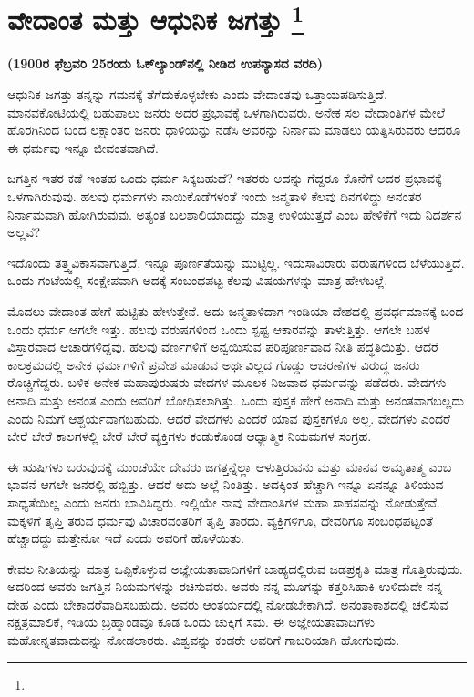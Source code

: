 
\chapter[ವೇದಾಂತ ಮತ್ತು ಆಧುನಿಕ ಜಗತ್ತು ]{ವೇದಾಂತ ಮತ್ತು ಆಧುನಿಕ ಜಗತ್ತು \protect\footnote{}}

\centerline{\textbf{(1900ರ ಫೆಬ್ರವರಿ 25ರಂದು ಓಕ್​ಲ್ಯಾಂಡ್​ನಲ್ಲಿ ನೀಡಿದ ಉಪನ್ಯಾಸದ ವರದಿ)}}

ಆಧುನಿಕ ಜಗತ್ತು ತನ್ನನ್ನು ಗಮನಕ್ಕೆ ತೆಗೆದುಕೊಳ್ಳಬೇಕು ಎಂದು ವೇದಾಂತವು ಒತ್ತಾಯಪಡಿಸುತ್ತಿದೆ. ಮಾನವಕೋಟಿಯಲ್ಲಿ ಬಹುಪಾಲು ಜನರು ಅದರ ಪ್ರಭಾವಕ್ಕೆ ಒಳಗಾಗಿರುವರು. ಅನೇಕ ಸಲ ವೇದಾಂತಿಗಳ ಮೇಲೆ ಹೊರಗಿನಿಂದ ಬಂದ ಲಕ್ಷಾಂತರ ಜನರು ಧಾಳಿಯನ್ನು ನಡೆಸಿ ಅವರನ್ನು ನಿರ್ನಾಮ ಮಾಡಲು ಯತ್ನಿಸಿರುವರು ಆದರೂ ಈ ಧರ್ಮವು ಇನ್ನೂ ಜೀವಂತವಾಗಿದೆ.

ಜಗತ್ತಿನ ಇತರ ಕಡೆ ಇಂತಹ ಒಂದು ಧರ್ಮ ಸಿಕ್ಕಬಹುದೆ? ಇತರರು ಅದನ್ನು ಗೆದ್ದರೂ ಕೊನೆಗೆ ಅದರ ಪ್ರಭಾವಕ್ಕೆ ಒಳಗಾಗಿರುವುವು. ಹಲವು ಧರ್ಮಗಳು ನಾಯಿಕೊಡೆಗಳಂತೆ ಇಂದು ಜನ್ಮತಾಳಿ ಕೆಲವು ದಿನಗಳಿದ್ದು ಅನಂತರ ನಿರ್ನಾಮವಾಗಿ ಹೋಗಿರುವುವು. ಅತ್ಯಂತ ಬಲಶಾಲಿಯಾದದ್ದು ಮಾತ್ರ ಉಳಿಯುತ್ತದೆ ಎಂಬ ಹೇಳಿಕೆಗೆ ಇದು ನಿದರ್ಶನ ಅಲ್ಲವೆ?

ಇದೊಂದು ತತ್ತ್ವವಿಕಾಸವಾಗುತ್ತಿದೆ, ಇನ್ನೂ ಪೂರ್ಣತೆಯನ್ನು ಮುಟ್ಟಿಲ್ಲ. ಇದು\break ಸಾವಿರಾರು ವರುಷಗಳಿಂದ ಬೆಳೆಯುತ್ತಿದೆ. ಒಂದು ಗಂಟೆಯಲ್ಲಿ ಸಂಕ್ಷೇಪವಾಗಿ ಅದಕ್ಕೆ ಸಂಬಂಧಪಟ್ಟ ಕೆಲವು ವಿಷಯಗಳನ್ನು ಮಾತ್ರ ಹೇಳಬಲ್ಲೆ.

ಮೊದಲು ವೇದಾಂತ ಹೇಗೆ ಹುಟ್ಟಿತು ಹೇಳುತ್ತೇನೆ. ಅದು ಜನ್ಮತಾಳಿದಾಗ ಇಂಡಿಯಾ ದೇಶದಲ್ಲಿ ಪ್ರವರ್ಧಮಾನಕ್ಕೆ ಬಂದ ಒಂದು ಧರ್ಮ ಆಗಲೇ ಇತ್ತು. ಹಲವು ವರುಷಗಳಿಂದ ಒಂದು ಸ್ಪಷ್ಟ ಆಕಾರವನ್ನು ತಾಳುತ್ತಿತ್ತು. ಆಗಲೇ ಬಹಳ ವಿಸ್ತಾರವಾದ ಆಚಾರಗಳಿದ್ದವು. ಹಲವು ವರ್ಣಗಳಿಗೆ ಅನ್ವಯಿಸುವ ಪರಿಪೂರ್ಣವಾದ ನೀತಿ ಪದ್ಧತಿಯಿತ್ತು. ಆದರೆ ಕಾಲಕ್ರಮದಲ್ಲಿ ಅನೇಕ ಧರ್ಮಗಳಿಗೆ ಪ್ರವೇಶ ಮಾಡುವ ಅರ್ಥವಿಲ್ಲದ ಗೊಡ್ಡು ಆಚರಣೆಗಳ ವಿರುದ್ಧ ಜನರು ರೊಚ್ಚಿಗೆದ್ದರು. ಬಳಿಕ ಅನೇಕ ಮಹಾಪುರುಷರು ವೇದಗಳ ಮೂಲಕ ನಿಜವಾದ ಧರ್ಮವನ್ನು ಪಡೆದರು. ವೇದಗಳು ಅನಾದಿ ಮತ್ತು ಅನಂತ ಎಂದು ಅವರಿಗೆ ಬೋಧಿಸಲಾಗಿತ್ತು. ಒಂದು ಪುಸ್ತಕ ಹೇಗೆ ಅನಾದಿ ಮತ್ತು ಅನಂತವಾಗಬಲ್ಲದು ಎಂದು ನಿಮಗೆ ಆಶ್ಚರ್ಯವಾಗಬಹುದು. ಆದರೆ ವೇದಗಳು ಎಂದರೆ ಯಾವ ಪುಸ್ತಕಗಳೂ ಅಲ್ಲ. ವೇದಗಳು ಎಂದರೆ ಬೇರೆ ಬೇರೆ ಕಾಲಗಳಲ್ಲಿ ಬೇರೆ ಬೇರೆ ವ್ಯಕ್ತಿಗಳು ಕಂಡುಕೊಂಡ ಆಧ್ಯಾತ್ಮಿಕ ನಿಯಮಗಳ ಸಂಗ್ರಹ.

ಈ ಋಷಿಗಳು ಬರುವುದಕ್ಕೆ ಮುಂಚೆಯೇ ದೇವರು ಜಗತ್ತನ್ನೆಲ್ಲಾ ಆಳುತ್ತಿರುವನು ಮತ್ತು ಮಾನವ ಅಮೃತಾತ್ಮ ಎಂಬ ಭಾವನೆ ಆಗಲೇ ಜನರಲ್ಲಿ ಹಬ್ಬಿತ್ತು. ಆದರೆ ಅದು ಅಲ್ಲೆ ನಿಂತಿತ್ತು. ಅದಕ್ಕಿಂತ ಹೆಚ್ಚಾಗಿ ಇನ್ನೂ ಏನನ್ನೂ ತಿಳಿಯುವ ಸಾಧ್ಯತೆಯಿಲ್ಲ ಎಂದು ಜನರು ಭಾವಿಸಿದ್ದರು. ಇಲ್ಲಿಯೇ ನಾವು ವೇದಾಂತಿಗಳ ಮಹಾ ಸಾಹಸವನ್ನು ನೋಡುತ್ತೇವೆ. ಮಕ್ಕಳಿಗೆ ತೃಪ್ತಿ ತರುವ ಧರ್ಮವು ವಿಚಾರವಂತರಿಗೆ ತೃಪ್ತಿ ತಾರದು. ವ್ಯಕ್ತಿಗಳಿಗೂ, ದೇವರಿಗೂ ಸಂಬಂಧಪಟ್ಟಂತೆ ಹೆಚ್ಚಾದದ್ದು ಮತ್ತೇನೋ ಇದೆ ಎಂದು ಅವರಿಗೆ ಹೊಳೆಯಿತು.

ಕೇವಲ ನೀತಿಯನ್ನು ಮಾತ್ರ ಒಪ್ಪಿಕೊಳ್ಳುವ ಅಜ್ಞೇಯತಾವಾದಿಗಳಿಗೆ ಬಾಹ್ಯದಲ್ಲಿರುವ ಜಡಪ್ರಕೃತಿ ಮಾತ್ರ ಗೊತ್ತಿರುವುದು. ಅದರಿಂದ ಅವರು ಜಗತ್ತಿನ ನಿಯಮಗಳನ್ನು ರಚಿಸುವರು. ಅವರು ನನ್ನ ಮೂಗನ್ನು ಕತ್ತರಿಸಿಹಾಕಿ ಉಳಿದುದೇ ನನ್ನ ದೇಹ ಎಂದು ಬೇಕಾದರೆ\break ವಾದಿಸಬಹುದು. ಅವರು ಆಂತರ್ಯದಲ್ಲಿ ನೋಡಬೇಕಾಗಿದೆ. ಅನಂತಾಕಾಶದಲ್ಲಿ ಚಲಿಸುವ ನಕ್ಷತ್ರಮಾಲಿಕೆ, ಇಡಿಯ ಬ್ರಹ್ಮಾಂಡವೂ ಕೂಡ ಒಂದು ಚುಕ್ಕಿಗೆ ಸಮ. ಈ ಅಜ್ಞೇಯತಾವಾದಿಗಳು ಮಹೋನ್ನತವಾದುದನ್ನು ನೋಡಲಾರರು. ವಿಶ್ವವನ್ನು ಕಂಡರೇ ಅವರಿಗೆ ಗಾಬರಿಯಾಗಿ ಹೋಗುವುದು.

